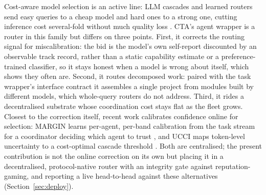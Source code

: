 \documentclass[11pt]{article}
\begin{document}
Cost-aware model selection is an active line: LLM cascades and learned routers send easy queries to a cheap model and hard ones to a strong one, cutting inference cost several-fold without much quality loss \citep{chen2023frugalgpt,ong2024routellm,ding2025bestroute}. CTA's agent wrapper is a router in this family but differs on three points. First, it corrects the routing signal for miscalibration: the bid is the model's own self-report discounted by an observable track record, rather than a static capability estimate or a preference-trained classifier, so it stays honest when a model is wrong about itself, which \citet{fradkin2026marketbench} shows they often are. Second, it routes decomposed work: paired with the task wrapper's interface contract it assembles a single project from modules built by different models, which whole-query routers do not address. Third, it rides a decentralised substrate whose coordination cost stays flat as the fleet grows. Closest to the correction itself, recent work calibrates confidence online for selection: MARGIN learns per-agent, per-band calibration from the task stream for a coordinator deciding which agent to trust \citep{armstrong2026margin}, and UCCI maps token-level uncertainty to a cost-optimal cascade threshold \citep{kotte2026ucci}. Both are centralised; the present contribution is not the online correction on its own but placing it in a decentralised, protocol-native router with an integrity gate against reputation-gaming, and reporting a live head-to-head against these alternatives (Section~\ref{sec:deploy}).
\end{document}
